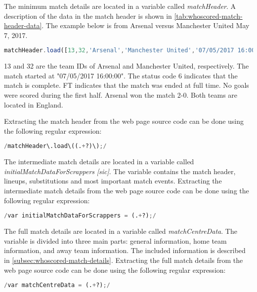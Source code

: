 The minimum match details are located in a variable called \textit{matchHeader}. A description of the data in the match header is shown in \cref{tab:whoscored-match-header-data}. The example below is from Arsenal versus Manchester United May 7, 2017.
\begin{lstlisting}[language=JavaScript,caption={Match header from Arsenal versus Manchester United May 7, 2017.}]
matchHeader.load([13,32,'Arsenal','Manchester United','07/05/2017 16:00:00','07/05/2017 00:00:00',6,'FT','0 : 0','2 : 0',,,'2 : 0','England','England']);
\end{lstlisting}
13 and 32 are the team IDs of Arsenal and Manchester United, respectively. The match started at "07/05/2017 16:00:00". The status code 6 indicates that the match is complete. FT indicates that the match was ended at full time. No goals were scored during the first half. Arsenal won the match 2-0. Both teams are located in England.

Extracting the match header from the web page source code can be done using the following regular expression:
\begin{lstlisting}[language=Python,caption={Regular expression used to extract match header data.}]
    /matchHeader\.load\((.+?)\);/
\end{lstlisting}

The intermediate match details are located in a variable called \textit{initialMatchDataForScrappers} \textit{[sic]}. The variable contains the match header, lineups, substitutions and most important match events. Extracting the intermediate match details from the web page source code can be done using the following regular expression:
\begin{lstlisting}[language=Python,caption={Regular expression used to extract initialMatchDataForScrappers.}]
    /var initialMatchDataForScrappers = (.+?);/
\end{lstlisting}

The full match details are located in a variable called \textit{matchCentreData}. The variable is divided into three main parts: general information, home team information, and away team information. The included information is described in \cref{subsec:whoscored-match-details}. Extracting the full match details from the web page source code can be done using the following regular expression:
\begin{lstlisting}[language=Python,caption={Regular expression used to extract matchCentreData.}]
    /var matchCentreData = (.+?);/
\end{lstlisting}


